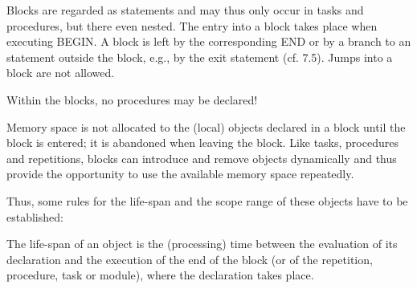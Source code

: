 

Blocks are regarded as statements and may thus only occur in tasks and
procedures, but there even nested. The entry into a block takes
place when executing BEGIN. A block is left by the corresponding END or
by a branch to an statement outside the block, e.g., by the exit
statement (cf. 7.5). Jumps into a block are not allowed.

Within the blocks, no procedures may be declared!

Memory space is not allocated to the (local) objects declared in a block
until the block is entered; it is abandoned when leaving the block. Like
tasks, procedures and repetitions, blocks can introduce and remove
objects dynamically and thus provide the opportunity to use the
available memory space repeatedly.

Thus, some rules for the life-span and the scope range of these objects
have to be established:

The life-span of an object is the (processing) time between the
evaluation of its declaration and the execution of the end of the block
(or of the repetition, procedure, task or module), where the declaration
takes place.


